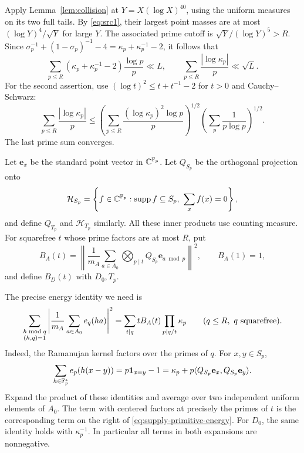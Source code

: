 Apply Lemma~\ref{lem:collision} at
\(Y=X(\log X)^{40}\), using the uniform measures on its two full tails.
By \eqref{eq:src1}, their largest point masses are at most
\((\log Y)^4/\sqrt Y\) for large \(Y\). The associated prime cutoff is
\(\sqrt Y/(\log Y)^5>R\). Since
\(\sigma_p^{-1}+(1-\sigma_p)^{-1}-4
 =\kappa_p+\kappa_p^{-1}-2\), it follows that
\begin{equation}\label{eq:src29}
 \sum_{p\le R}(\kappa_p+\kappa_p^{-1}-2)\frac{\log p}{p}\ll L,
 \qquad
 \sum_{p\le R}\frac{|\log\kappa_p|}{p}\ll\sqrt L .
\end{equation}
For the second assertion, use
\((\log t)^2\le t+t^{-1}-2\) for \(t>0\) and Cauchy--Schwarz:
\[
 \sum_{p\le R}\frac{|\log\kappa_p|}{p}
 \le
 \left(\sum_{p\le R}
       \frac{(\log\kappa_p)^2\log p}{p}\right)^{1/2}
 \left(\sum_p\frac1{p\log p}\right)^{1/2}.
\]
The last prime sum converges.

Let \(\mathbf e_x\) be the standard point vector in \(\mathbb C^{\mathbb F_p}\).
Let \(Q_{S_p}\) be the orthogonal projection onto
\[
 \mathcal H_{S_p}
 =\left\{f\in\mathbb C^{\mathbb F_p}:
      \operatorname{supp} f\subseteq S_p,\ \sum_x f(x)=0\right\},
\]
and define \(Q_{T_p}\) and \(\mathcal H_{T_p}\) similarly.
All these inner products use counting measure. For squarefree \(t\)
whose prime factors are at most \(R\), put
\[
 B_A(t)=
 \left\|\frac1{m_A}\sum_{a\in A_0}
       \bigotimes_{p\mid t}Q_{S_p}\mathbf e_{a\bmod p}\right\|^2,
 \qquad B_A(1)=1,
\]
and define \(B_D(t)\) with \(D_0,T_p\).

The precise energy identity we need is
\begin{equation}\label{eq:supply-primitive-energy}
 \sum_{\substack{h\bmod q\\(h,q)=1}}
       \left|\frac1{m_A}\sum_{a\in A_0}e_q(ha)\right|^2
   =\sum_{t\mid q}tB_A(t)\prod_{p\mid q/t}\kappa_p
       \qquad(q\le R,\ q\ {\rm squarefree}).
\end{equation}
Indeed, the Ramanujan kernel factors over the primes of \(q\).
For \(x,y\in S_p\),
\[
 \sum_{h\in\mathbb F_p^*}e_p(h(x-y))
 =p\mathbf 1_{x=y}-1
 =\kappa_p+
        p\langle Q_{S_p}\mathbf e_x,Q_{S_p}\mathbf e_y\rangle .
\]
Expand the product of these identities and average over two independent
uniform elements of \(A_0\). The term with centered factors at precisely
the primes of \(t\) is the corresponding term on the right of
\eqref{eq:supply-primitive-energy}. For \(D_0\), the same identity holds
with \(\kappa_p^{-1}\). In particular all terms in both expansions are
nonnegative.

